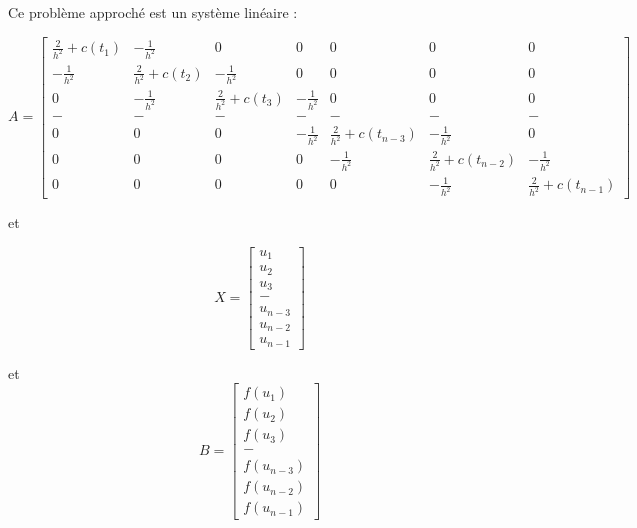 \documentclass[12pt, letterpaper]{article}
\begin{document}
\begin{enumerate}
  Ce problème approché est un système linéaire :

  \begin{equation*}
    A =
    \left[
    \begin{array}{lllllll}
      \frac{2}{h^2} + c(t_1) & - \frac{1}{h^2} & 0 & 0 & 0 & 0 & 0 \\
      - \frac{1}{h^2} & \frac{2}{h^2} + c(t_2) & - \frac{1}{h^2} & 0 &
      0 & 0 & 0 \\
      0 & - \frac{1}{h^2} & \frac{2}{h^2} + c(t_3) & - \frac{1}{h^2} &
      0 & 0 & 0 \\
      - & - & - & - & - & - & - \\
      0 & 0 & 0 &- \frac{1}{h^2} & \frac{2}{h^2} + c(t_{n-3}) & - \frac{1}{h^2} &
      0 \\
      0 & 0 & 0 & 0 &- \frac{1}{h^2} & \frac{2}{h^2} + c(t_{n-2}) & - \frac{1}{h^2} \\
      0 & 0 & 0 & 0 & 0 &- \frac{1}{h^2} & \frac{2}{h^2} + c(t_{n-1})
    \end{array}
    \right]
  \end{equation*}

  et
  
  \begin{equation*}
    X =
    \left[
      \begin{array}{l}
        u_1 \\
        u_2 \\
        u_3 \\
        - \\
        u_{n-3} \\
        u_{n-2} \\
        u_{n-1}
      \end{array}
      \right]
  \end{equation*}

  et
    \begin{equation*}
      B =
      \left[
        \begin{array}{l}
          f(u_1) \\
          f(u_2) \\
          f(u_3) \\
          - \\
          f(u_{n-3}) \\
          f(u_{n-2}) \\
          f(u_{n-1})
        \end{array}
        \right]
    \end{equation*}


\end{enumerate}
\end{document}
